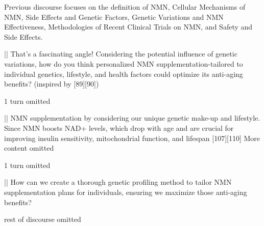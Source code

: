 \begin{showcase}[title=Topic: The effects of NMN supplements on human anti-aging]

{Previous discourse focuses on the definition of NMN, Cellular Mechanisms of NMN, Side Effects and Genetic Factors, Genetic Variations and NMN Effectiveness, Methodologies of Recent Clinical Trials on NMN, and Safety and Side Effects.}

||
That's a fascinating angle! Considering the potential influence of genetic variations, how do you think personalized NMN supplementation-tailored to individual genetics, lifestyle, and health factors could optimize its anti-aging benefits? 
 (inspired by [89][90])

{1 turn omitted}

||
NMN supplementation by considering our unique genetic make-up and lifestyle. Since NMN boosts NAD+ levels, which drop with age and are crucial for improving insulin sensitivity, mitochondrial function, and lifespan [107][110] {More content omitted}

{1 turn omitted}

||
How can we create a thorough genetic profiling method to tailor NMN supplementation plans for individuals, ensuring we maximize those anti-aging benefits?

{rest of discourse omitted}

\end{showcase}